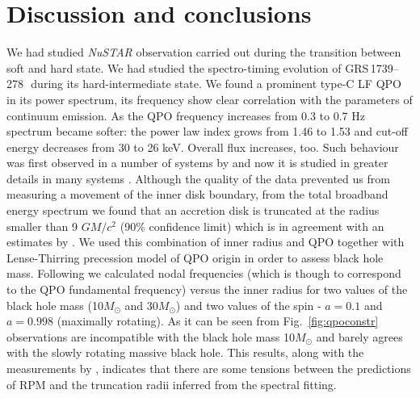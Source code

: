 \documentclass[a4paper,fleqn,usenatbib]{mnras}
\def\grs{{GRS\,1739--278\,}}
\begin{document}
\section{Discussion and conclusions}
We had studied {\it NuSTAR} observation carried out during the transition between soft and hard state. 
We had studied the spectro-timing evolution of \grs\, during its hard-intermediate state.  
We found a prominent type-C LF QPO in its power spectrum, its frequency show clear correlation with the parameters of continuum emission. 
As the QPO frequency increases from 0.3 to 0.7 Hz spectrum became softer: the power law index grows from 1.46 to 1.53 and cut-off energy decreases from 30 to 26 keV. 
Overall flux increases, too. 
Such behaviour was first observed in a number of systems by \citet{dimatteo99} and now it is studied in greater details in many systems \citep[see e.g.][ and many more]{vignarca03,stiele13,seifina14,fuerst16_gx339}. 
Although the quality of the data prevented us from measuring a movement of the inner disk boundary, from the total broadband energy spectrum we found that an accretion disk is truncated at the radius smaller than 9 $GM/c^{2}$ (90\% confidence limit) which is in agreement with an estimates by \citet{miller15_nust}. 
We used this combination of inner radius and QPO together with Lense-Thirring precession model of QPO origin \citep{ingram09} in order to assess black hole mass. 
Following \citet{ingram14} we calculated nodal frequencies (which is though to correspond to the QPO fundamental frequency) versus the inner radius for two values of the black hole mass (10$M_{\odot}$ and 30$M_{\odot}$) and two values of the spin - $a=0.1$ and $a=0.998$ (maximally rotating). 
As it can be seen from Fig.~\ref{fig:qpoconstr} observations are incompatible with the black hole mass 10$M_{\odot}$ and barely agrees with the slowly rotating massive black hole. 
This results, along with the measurements by \cite{fuerst16_gx339}, indicates that there are some tensions between the predictions of RPM and the truncation radii inferred from the spectral fitting.
\end{document}
